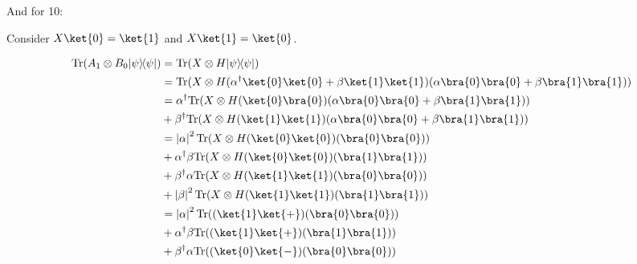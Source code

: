 \documentclass{article}
\newcommand{\ketbra}[2]{|#1\rangle\!\langle #2|}
\newcommand{\trace}{{\rm Tr}}
\newcommand{\abs}[1]{\left\lvert #1 \right\rvert}
\begin{document}
\begin{enumerate}
\begin{enumerate}
                And for 10:

                Consider $X\ket{0}=\ket{1}$ and $X\ket{1}=\ket{0}$.

                $$\begin{aligned}
                    \trace(A_1\otimes B_0\ketbra{\psi}{\psi}) & = \trace(X\otimes H\ketbra{\psi}{\psi})                                                                          \\
                                                              & = \trace(X\otimes H(\alpha^\dagger\ket{0}\ket{0}+\beta\ket{1}\ket{1})(\alpha\bra{0}\bra{0}+\beta\bra{1}\bra{1})) \\
                                                              & = \alpha^\dagger\trace(X\otimes H(\ket{0}\bra{0})(\alpha\bra{0}\bra{0}+\beta\bra{1}\bra{1}))                     \\
                                                              & + \beta^\dagger\trace(X\otimes H(\ket{1}\ket{1})(\alpha\bra{0}\bra{0}+\beta\bra{1}\bra{1}))                      \\
                                                              & = \abs{\alpha}^2\trace(X\otimes H(\ket{0}\ket{0})(\bra{0}\bra{0}))                                               \\
                                                              & + \alpha^\dagger\beta\trace(X\otimes H(\ket{0}\ket{0})(\bra{1}\bra{1}))                                          \\
                                                              & + \beta^\dagger\alpha\trace(X\otimes H(\ket{1}\ket{1})(\bra{0}\bra{0}))                                          \\
                                                              & + \abs{\beta}^2\trace(X\otimes H(\ket{1}\ket{1})(\bra{1}\bra{1}))                                                \\
                                                              & = \abs{\alpha}^2\trace((\ket{1}\ket{+})(\bra{0}\bra{0}))                                                         \\
                                                              & + \alpha^\dagger\beta\trace((\ket{1}\ket{+})(\bra{1}\bra{1}))                                                    \\
                                                              & + \beta^\dagger\alpha\trace((\ket{0}\ket{-})(\bra{0}\bra{0}))                                                    \\

\end{aligned}$$
\end{enumerate}
\end{enumerate}
\end{document}
